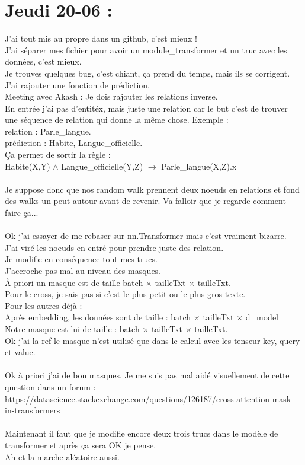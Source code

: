 \documentclass{article}
\begin{document}
\section*{Jeudi 20-06 :}
J'ai tout mis au propre dans un github, c'est mieux !\\
J'ai séparer mes fichier pour avoir un module\_transformer et un truc avec les données, c'est mieux.\\
Je trouves quelques bug, c'est chiant, ça prend du temps, mais ils se corrigent.\\
J'ai rajouter une fonction de prédiction.\\
Meeting avec Akash : Je dois rajouter les relations inverse.\\
En entrée j'ai pas d'entitéx, mais juste une relation car le but c'est de trouver une séquence de relation qui donne la même chose. Exemple :\\
relation : Parle\_langue.\\
prédiction : Habite, Langue\_officielle.\\
Ça permet de sortir la règle :\\
Habite(X,Y) $\wedge$ Langue\_officielle(Y,Z) $\to$ Parle\_langue(X,Z).x\\
\\
Je suppose donc que nos random walk prennent deux noeuds     en relations et fond des walks un peut autour avant de revenir. Va falloir que je regarde comment faire ça...\\
\\
Ok j'ai essayer de me rebaser sur nn.Transformer mais c'est vraiment bizarre.\\
J'ai viré les noeuds en entré pour prendre juste des relation.\\
Je modifie en conséquence tout mes trucs.\\
J'accroche pas mal au niveau des masques.\\
À priori un masque est de taille batch $\times$ tailleTxt $\times$ tailleTxt.\\
Pour le cross, je sais pas si c'est le plus petit ou le plus gros texte.\\
Pour les autres déjà : \\
Après embedding, les données sont de taille : batch $\times$ tailleTxt $\times$ d\_model\\
Notre masque est lui de taille : batch $\times$ tailleTxt $\times$ tailleTxt.\\
Ok j'ai la ref le masque n'est utilisé que dans le calcul avec les tenseur key, query et value.\\
\\
Ok à priori j'ai de bon masques. Je me suis pas mal aidé visuellement de cette question dans un forum :\\
https://datascience.stackexchange.com/questions/126187/cross-attention-mask-in-transformers\\
\\
Maintenant il faut que je modifie encore deux trois trucs dans le modèle de transformer et après ça sera OK je pense.\\
Ah et la marche aléatoire aussi.\\
\end{document}
